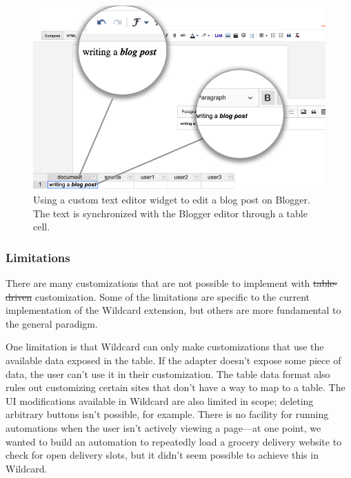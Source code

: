 \documentclass[sigplan,screen,10pt,anonymous,review]{acmart}
\providecommand{\DIFadd}[1]{{\protect\color{blue}\uwave{#1}}} %
\providecommand{\DIFdel}[1]{{\protect\color{red}\sout{#1}}}                      %
\providecommand{\DIFaddbegin}{} %
\providecommand{\DIFaddend}{} %
\providecommand{\DIFdelbegin}{} %
\providecommand{\DIFdelend}{} %
\begin{document}
\begin{figure}
\hypertarget{fig:blogger}{%
\centering
\includegraphics[width=\columnwidth]{media/blogger.png}
\caption{Using a custom text editor widget to edit a blog post on Blogger. The text is synchronized with the Blogger editor through a table cell.}\label{fig:blogger}
}
\end{figure}

\hypertarget{limitations}{%
\subsubsection{Limitations}\label{limitations}}

There are many customizations that are not possible to implement with
\DIFdelbegin \DIFdel{table-driven }\DIFdelend \DIFaddbegin \DIFadd{data-driven }\DIFaddend customization. Some of the limitations are specific to the
current implementation of the Wildcard extension, but others are more
fundamental to the general paradigm.

One limitation is that Wildcard can only make customizations that use
the available data exposed in the table. If the adapter doesn't expose
some piece of data, the user can't use it in their customization. The
table data format also rules out customizing certain sites that don't
have a way to map to a table. The UI modifications available in Wildcard
are also limited in scope; deleting arbitrary buttons isn't possible,
for example. There is no facility for running automations when the user
isn't actively viewing a page---at one point, we wanted to build an
automation to repeatedly load a grocery delivery website to check for
open delivery slots, but it didn't seem possible to achieve this in
Wildcard.
\end{document}
